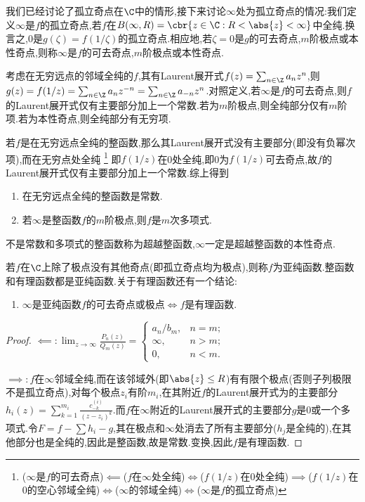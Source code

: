 \documentclass{article}
\begin{document}
我们已经讨论了孤立奇点在$\C$中的情形,接下来讨论$\infty$处为孤立奇点的情况:我们定义$\infty$是$f$的孤立奇点,若$f$在$B(\infty,R)=\cbr{z\in\C:R<\abs{z}<\infty}$中全纯.换言之,0是$g(\zeta)=f(1/\zeta)$的孤立奇点.相应地,若$\zeta=0$是$g$的可去奇点,$m$阶极点或本性奇点,则称$\infty$是$f$的可去奇点,$m$阶极点或本性奇点.

考虑在无穷远点的邻域全纯的$f$,其有Laurent展开式$f(z)=\sum_{n\in\Z}a_nz^n$,则$g(z)=f(1/z)=\sum_{n\in\Z}a_nz^{-n}=\sum_{n\in\Z}a_{-n}z^n$.对照定义,若$\infty$是$f$的可去奇点,则$f$的Laurent展开式仅有主要部分加上一个常数.若为$m$阶极点,则全纯部分仅有$m$阶项.若为本性奇点,则全纯部分有无穷项.

若$f$是在无穷远点全纯的整函数,那么其Laurent展开式没有主要部分(即没有负幂次项),而在无穷点处全纯
\footnote{($\infty$是$f$的可去奇点)$\impliedby$($f$在$\infty$处全纯)$\iff$($f(1/z)$在0处全纯)$\implies$($f(1/z)$在0的空心邻域全纯)$\iff$($\infty$的邻域全纯)$\iff$($\infty$是$f$的孤立奇点)}
即$f(1/z)$在0处全纯,即0为$f(1/z)$可去奇点,故$f$的Laurent展开式仅有主要部分加上一个常数.综上得到
\begin{enumerate}[resume]
    \item 在无穷远点全纯的整函数是常数.
    \item 若$\infty$是整函数$f$的$m$阶极点,则$f$是$m$次多项式.
\end{enumerate}
不是常数和多项式的整函数称为超越整函数,$\infty$一定是超越整函数的本性奇点.

若$f$在$\C$上除了极点没有其他奇点(即孤立奇点均为极点),则称$f$为亚纯函数.整函数和有理函数都是亚纯函数.关于有理函数还有一个结论:
\begin{enumerate}[resume]
    \item $\infty$是亚纯函数$f$的可去奇点或极点$\iff f$是有理函数.
\end{enumerate}
\begin{proof}
    $\impliedby:\lim_{z\to \infty}\frac{P_n(z)}{Q_m(z)}=\begin{cases}
        a_n/b_m,&n=m;\\\infty,&n>m;\\0,&n<m.
    \end{cases}$

    $\implies:f$在$\infty$邻域全纯,而在该邻域外(即$\abs{z}\leq R$)有有限个极点(否则子列极限不是孤立奇点),对每个极点$z_i$有阶$m_i$,在其附近$f$的Laurent展开式为的主要部分$h_i(z)=\sum_{k=1}^{m_i}\frac{c^{(i)}_{-k}}{(z-z_i)^k}$.而$f$在$\infty$附近的Laurent展开式的主要部分$g$是0或一个多项式.令$F=f-\sum h_i-g$,其在极点和$\infty$处消去了所有主要部分($h_j$是全纯的),在其他部分也是全纯的,因此是整函数,故是常数.变换,因此$f$是有理函数.
\end{proof}
\end{document}
